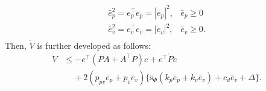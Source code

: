 \documentclass[letterpaper, 10 pt, conference]{ieeeconf}  %
\begin{document}
\begin{equation}
\begin{array}{ll}
\bar{e}_p^2 = e_p^\top e_p = |e_p|^2, & \bar{e}_p \geq 0 \\
\bar{e}_v^2 = e_v^\top e_v = |e_v|^2, & \bar{e}_v \geq 0. \\
\end{array} \nonumber 
\end{equation} 
Then, $\dot{V}$ is further developed as follows:
\begin{align}
\dot{V} &\leq -e^\top( PA + A^\top P) e + e^\top \dot{P}e  \label{eq:aaa}\\
 &\;\;\;\;+2(p_{pv}\bar{e}_p+p_v\bar{e}_v)\{\bar{\text{s}}_\Phi(k_p\bar{e}_p+k_v\bar{e}_v) + c_d\bar{e}_v + \Delta\}. \nonumber 
\end{align}
\end{document}

